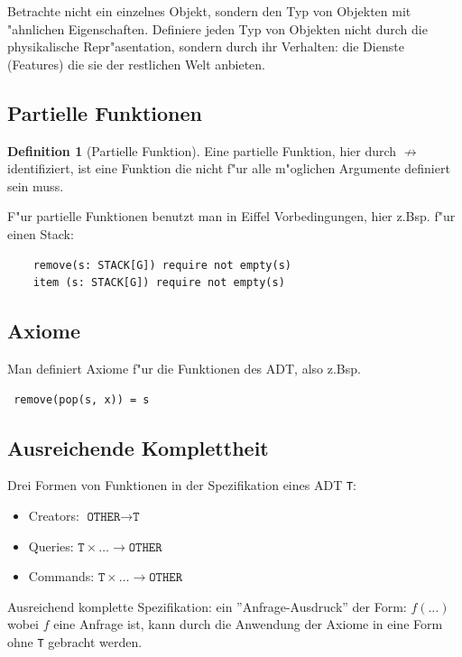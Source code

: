 \documentclass[german, 10pt, a4paper, twocolumn]{scrartcl}
\theoremstyle{definition}
\newtheorem*{definition}{Definition}
\begin{document}
Betrachte nicht ein einzelnes Objekt, sondern den Typ von Objekten mit "ahnlichen Eigenschaften. Definiere jeden Typ von Objekten nicht durch die physikalische Repr"asentation, sondern durch ihr Verhalten: die Dienste (Features) die sie der restlichen Welt anbieten.

\subsection{Partielle Funktionen}

\begin{definition}[Partielle Funktion]
	Eine partielle Funktion, hier durch $\not \to$ identifiziert, ist eine Funktion die nicht f"ur alle m"oglichen Argumente definiert sein muss.
\end{definition}

F"ur partielle Funktionen benutzt man in Eiffel Vorbedingungen, hier z.Bsp. f"ur einen Stack:
\begin{verbatim}
	remove(s: STACK[G]) require not empty(s)
	item (s: STACK[G]) require not empty(s)
\end{verbatim}

\subsection{Axiome}

Man definiert Axiome f"ur die Funktionen des ADT, also z.Bsp.
\begin{verbatim}
 remove(pop(s, x)) = s
\end{verbatim}

\subsection{Ausreichende Komplettheit}

Drei Formen von Funktionen in der Spezifikation eines ADT \texttt{T}:
\begin{itemize}
	\item Creators: $\texttt{OTHER} \to \texttt{T}$
	\item Queries: $\texttt{T}\times\ldots \to \texttt{OTHER}$
	\item Commands: $\texttt{T}\times\ldots \to \texttt{OTHER}$
\end{itemize}

Ausreichend komplette Spezifikation: ein ''Anfrage-Ausdruck'' der Form: $f(\ldots)$ wobei $f$ eine Anfrage ist, kann durch die Anwendung der Axiome in eine Form ohne \texttt{T} gebracht werden.
\end{document}
